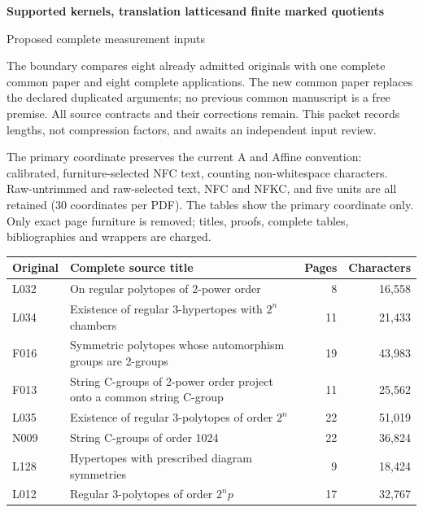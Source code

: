 \documentclass[11pt,a4paper]{article}
\begin{document}
\begin{center}\large\textbf{Supported kernels, translation lattices\newline and finite marked quotients}\par
\normalsize Proposed complete measurement inputs\end{center}
The boundary compares eight already admitted originals with one complete common
paper and eight complete applications. The new common paper replaces the declared
duplicated arguments; no previous common manuscript is a free premise. All source
contracts and their corrections remain. This packet records lengths, not compression
factors, and awaits an independent input review.

The primary coordinate preserves the current A and Affine convention: calibrated,
furniture-selected NFC text, counting non-whitespace characters. Raw-untrimmed and
raw-selected text, NFC and NFKC, and five units are all retained (30 coordinates per
PDF). The tables show the primary coordinate only. Only exact page furniture is
removed; titles, proofs, complete tables, bibliographies and wrappers are charged.

\small
\begin{tabularx}{\textwidth}{@{}lLrr@{}}\toprule
Original & Complete source title & Pages & Characters\\\midrule
L032 & On regular polytopes of 2-power order & 8 & 16,558 \\
L034 & Existence of regular 3-hypertopes with $2^n$ chambers & 11 & 21,433 \\
F016 & Symmetric polytopes whose automorphism groups are 2-groups & 19 & 43,983 \\
F013 & String C-groups of 2-power order project onto a common string C-group & 11 & 25,562 \\
L035 & Existence of regular 3-polytopes of order $2^n$ & 22 & 51,019 \\
N009 & String C-groups of order 1024 & 22 & 36,824 \\
L128 & Hypertopes with prescribed diagram symmetries & 9 & 18,424 \\
L012 & Regular 3-polytopes of order $2^np$ & 17 & 32,767 \\
\bottomrule\end{tabularx}\par
\end{document}

